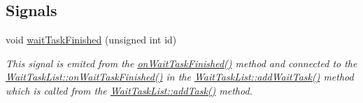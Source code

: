 \subsection*{Signals}
\begin{DoxyCompactItemize}
\item 
void \hyperlink{class_waiting_task_a603610acef7edaa2e0e51af6776a18ca}{wait\+Task\+Finished} (unsigned int id)
\begin{DoxyCompactList}\small\item\em This signal is emited from the \hyperlink{class_waiting_task_a93e5b1b87723904e6a4babef1bbd4727}{on\+Wait\+Task\+Finished()} method and connected to the \hyperlink{class_wait_task_list_ab6c3634d0739c8948b028c8db86d804c}{Wait\+Task\+List\+::on\+Wait\+Task\+Finished()} in the \hyperlink{class_wait_task_list_a2724cb9d9e7f897a4bf0c44054ad2c29}{Wait\+Task\+List\+::add\+Wait\+Task()} method which is called from the \hyperlink{class_wait_task_list_a429d0b45f82a2eef00c5dacffbbc1f70}{Wait\+Task\+List\+::add\+Task()} method. \end{DoxyCompactList}\end{DoxyCompactItemize}
